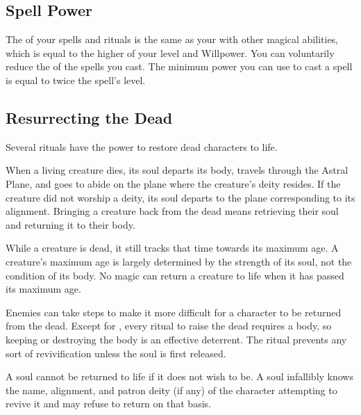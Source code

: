     \subsection{Spell Power}

        The  of your spells and rituals is the same as your  with other magical abilities, which is equal to the higher of your level and Willpower.
        You can voluntarily reduce the  of the spells you cast.
        The minimum power you can use to cast a spell is equal to twice the spell's level.

    \subsection{Resurrecting the Dead}\label{Resurrecting the Dead}
        Several rituals have the power to restore dead characters to life.

        When a living creature dies, its soul departs its body, travels through the Astral Plane, and goes to abide on the plane where the creature's deity resides.
        If the creature did not worship a deity, its soul departs to the plane corresponding to its alignment.
        Bringing a creature back from the dead means retrieving their soul and returning it to their body.

         While a creature is dead, it still tracks that time towards its maximum age.
        A creature's maximum age is largely determined by the strength of its soul, not the condition of its body.
        No magic can return a creature to life when it has passed its maximum age.

         Enemies can take steps to make it more difficult for a character to be returned from the dead.
        Except for , every ritual to raise the dead requires a body, so keeping or destroying the body is an effective deterrent.
        The  ritual prevents any sort of revivification unless the soul is first released.

         A soul cannot be returned to life if it does not wish to be.
        A soul infallibly knows the name, alignment, and patron deity (if any) of the character attempting to revive it and may refuse to return on that basis.

